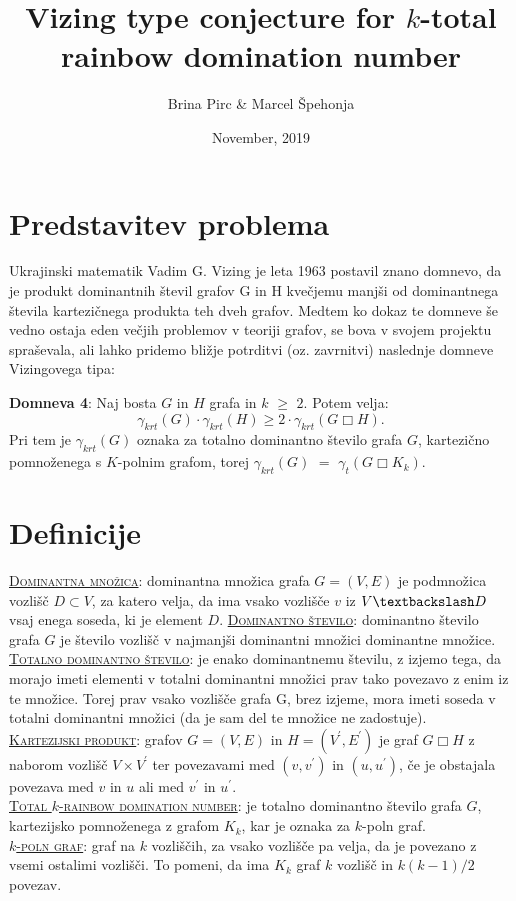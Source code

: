 \documentclass[12pt, a4paper]{article}
\begin{document}
\title{Vizing type conjecture for $k$-total rainbow domination number}
\author{Brina Pirc \& Marcel Špehonja}
\date{November, 2019}
\maketitle

\section{Predstavitev problema}
Ukrajinski matematik Vadim G. Vizing je leta 1963 postavil znano domnevo, da je produkt dominantnih števil grafov G in H kvečjemu manjši od dominantnega števila kartezičnega produkta teh dveh grafov. Medtem ko dokaz te domneve še vedno ostaja eden večjih problemov v teoriji grafov, se bova v svojem projektu spraševala, ali lahko pridemo bližje potrditvi (oz. zavrnitvi) naslednje domneve Vizingovega tipa: 

\textbf{Domneva 4}:  Naj bosta $G$ in $H$ grafa in $k$ $\geq$ $2$. Potem velja: $$\gamma_{krt}(G) \cdot \gamma_{krt}(H) \geq 2 \cdot \gamma_{krt}(G \Box H).$$
Pri tem je $\gamma_{krt}(G)$ oznaka za totalno dominantno število grafa $G$, kartezično pomnoženega s $K$-polnim grafom, torej $\gamma_{krt}(G)$ $=$ $\gamma_{t}(G \Box K_k)$.

\section{Definicije}

\underline{\textsc{Dominantna množica}}: dominantna množica grafa $G = (V,E)$ je podmnožica vozlišč $D \subset V$, za katero velja, da ima vsako vozlišče $v$ iz $V \textbackslash D$ vsaj enega soseda, ki je element $D$.
\underline{\textsc{Dominantno število}}: dominantno število grafa $G$ je število vozlišč v najmanjši dominantni množici dominantne množice. \\
\underline{\textsc{Totalno dominantno število}}: je enako dominantnemu številu, z izjemo tega, da morajo imeti elementi v totalni dominantni množici prav tako povezavo z enim iz te množice. Torej prav vsako vozlišče grafa G, brez izjeme, mora imeti soseda v totalni dominantni množici (da je sam del te množice ne zadostuje). \\
\underline{\textsc{Kartezijski produkt}}: grafov $G = (V, E)$ in $H = (V^{\prime}, E^{\prime})$ je graf $G \Box H$ z naborom vozlišč $V \times V^{\prime}$ ter povezavami med $(v, v^{\prime})$ in $(u, u^{\prime})$, če je obstajala povezava med $v$ in $u$ ali med $v^{\prime}$ in $u^{\prime}$. \\
\underline{\textsc{Total $k$-rainbow domination number}}: je totalno dominantno število grafa $G$, kartezijsko pomnoženega z grafom $K_k$, kar je oznaka za $k$-poln graf. \\
\underline{\textsc{$k$-poln graf}}: graf na $k$ vozliščih, za vsako vozlišče pa velja, da je povezano z vsemi ostalimi vozlišči. To pomeni, da ima $K_k$ graf $k$ vozlišč in $k (k-1)/2$ povezav.
\newpage
\end{document}
